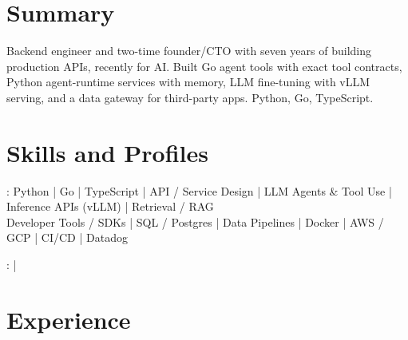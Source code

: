 \documentclass[print]{jack-resume}
\begin{document}
\pagecolor{darkmodeBackground}


\begin{minipage}[t][1cm][t]{.03\textwidth}
    \hfill
\end{minipage}

\section{Summary}
Backend engineer and two-time founder/CTO with seven years of building production APIs, recently for AI. Built Go agent tools with exact tool contracts, Python agent-runtime services with memory, LLM fine-tuning with vLLM serving, and a data gateway for third-party apps. Python, Go, TypeScript.
\sectionsep

\section{Skills and Profiles}
:
Python \hfill | \hfill
Go \hfill | \hfill
TypeScript \hfill | \hfill
API / Service Design \hfill | \hfill
LLM Agents \& Tool Use \hfill | \hfill
Inference APIs (vLLM) \hfill | \hfill
Retrieval / RAG \\
\hspace{1.0cm} Developer Tools / SDKs \hfill | \hfill
SQL / Postgres \hfill | \hfill
Data Pipelines \hfill | \hfill
Docker \hfill | \hfill
AWS / GCP \hfill | \hfill
CI/CD \hfill | \hfill
Datadog \\

\raggedright{
    :
      \href{https://www.linkedin.com/in/jack-sturtevant/}{ \ExternalLink} |
     \href{https://github.com/jacksturt}{ \ExternalLink}}

\section{Experience}
\end{document}
